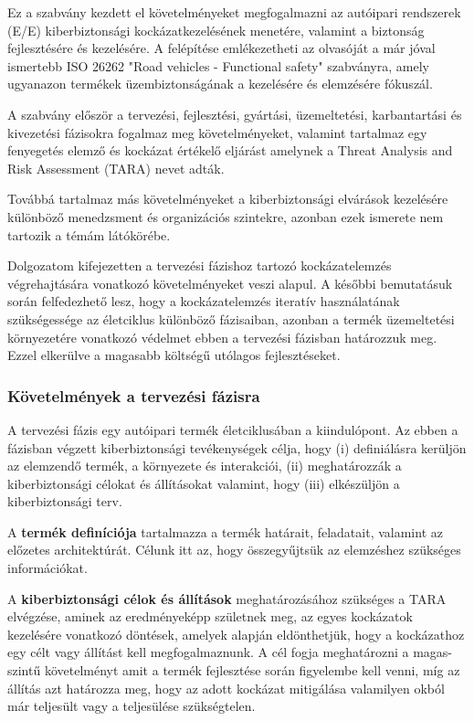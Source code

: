 Ez a szabvány kezdett el követelményeket megfogalmazni az autóipari rendszerek (E/E) kiberbiztonsági kockázatkezelésének menetére, valamint a biztonság fejlesztésére és kezelésére. A felépítése emlékezetheti az olvasóját a már jóval ismertebb ISO 26262 "Road vehicles - Functional safety" szabványra, amely ugyanazon termékek üzembiztonságának a kezelésére és elemzésére fókuszál.

A szabvány először a tervezési, fejlesztési, gyártási, üzemeltetési, karbantartási és kivezetési fázisokra fogalmaz meg követelményeket, valamint tartalmaz egy fenyegetés elemző és kockázat értékelő eljárást amelynek a Threat Analysis and Risk Assessment (TARA) nevet adták.

Továbbá tartalmaz más követelményeket a kiberbiztonsági elvárások kezelésére különböző menedzsment és organizációs szintekre, azonban ezek ismerete nem tartozik a témám látókörébe.

Dolgozatom kifejezetten a tervezési fázishoz tartozó kockázatelemzés végrehajtására vonatkozó követelményeket veszi alapul. A későbbi bemutatásuk során felfedezhető lesz, hogy a kockázatelemzés iteratív használatának szükségessége az életciklus különböző fázisaiban, azonban a termék üzemeltetési környezetére vonatkozó védelmet ebben a tervezési fázisban határozzuk meg. Ezzel elkerülve a magasabb költségű utólagos fejlesztéseket.

\subsubsection{Követelmények a tervezési fázisra}
A tervezési fázis egy autóipari termék életciklusában a kiindulópont. Az ebben a fázisban végzett kiberbiztonsági tevékenységek célja, hogy (i) definiálásra kerüljön az elemzendő termék, a környezete és interakciói, (ii) meghatározzák a kiberbiztonsági célokat és állításokat valamint, hogy (iii) elkészüljön a kiberbiztonsági terv.

A \textbf{termék definíciója} tartalmazza a termék határait, feladatait, valamint az előzetes architektúrát. Célunk itt az, hogy összegyűjtsük az elemzéshez szükséges információkat.

A \textbf{kiberbiztonsági célok és állítások} meghatározásához szükséges a TARA elvégzése, aminek az eredményeképp születnek meg, az egyes kockázatok kezelésére vonatkozó döntések, amelyek alapján eldönthetjük, hogy a kockázathoz egy célt vagy állítást kell megfogalmaznunk. A cél fogja meghatározni a magas-szintű követelményt amit a termék fejlesztése során figyelembe kell venni, míg az állítás azt határozza meg, hogy az adott kockázat mitigálása valamilyen okból már teljesült vagy a teljesülése szükségtelen.

